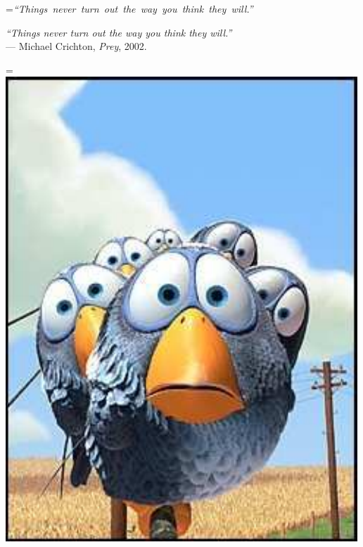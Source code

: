 \begin{centering}

{=\hbox{\emph{``Things never turn out the way you think they will.''}}
 \begin{minipage}{\wd0}
 \emph{``Things never turn out the way you think they will.''}\\%
 \null \hfill  --- Michael Crichton, \emph{Prey}, 2002.
 \end{minipage}
 \par}

\vspace{.5cm}

{=\hbox{\includegraphics{pixar[forTheBirds]}}
 \begin{minipage}{\wd0}

\end{minipage}}
\end{centering}
